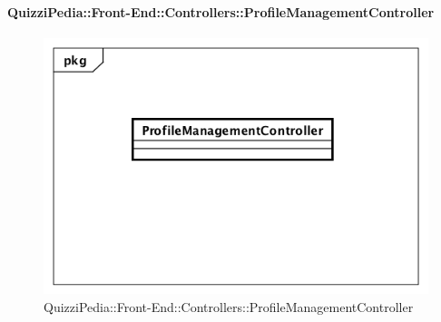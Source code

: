 \paragraph{QuizziPedia::Front-End::Controllers::ProfileManagementController}
\begin{figure} [ht]
	\centering
	\includegraphics[scale=0.45]{UML/Classi/Front-End/QuizziPedia_Front-end_Controller_ProfileManagementController.png}
	\caption{QuizziPedia::Front-End::Controllers::ProfileManagementController}
\end{figure} \FloatBarrier

